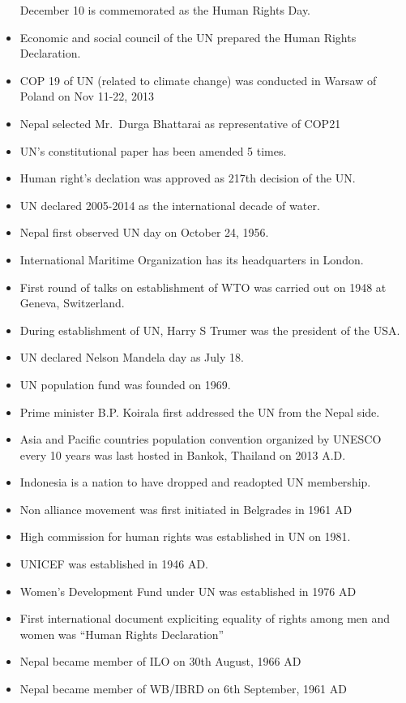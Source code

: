 \documentclass[
]{book}
\begin{document}
\begin{itemize}
  December 10 is commemorated as the Human Rights Day.
\item
  Economic and social council of the UN prepared the Human Rights Declaration.
\item
  COP 19 of UN (related to climate change) was conducted in Warsaw of Poland on Nov 11-22, 2013
\item
  Nepal selected Mr.~Durga Bhattarai as representative of COP21
\item
  UN's constitutional paper has been amended 5 times.
\item
  Human right's declation was approved as 217th decision of the UN.
\item
  UN declared 2005-2014 as the international decade of water.
\item
  Nepal first observed UN day on October 24, 1956.
\item
  International Maritime Organization has its headquarters in London.
\item
  First round of talks on establishment of WTO was carried out on 1948 at Geneva, Switzerland.
\item
  During establishment of UN, Harry S Trumer was the president of the USA.
\item
  UN declared Nelson Mandela day as July 18.
\item
  UN population fund was founded on 1969.
\item
  Prime minister B.P. Koirala first addressed the UN from the Nepal side.
\item
  Asia and Pacific countries population convention organized by UNESCO every 10 years was last hosted in Bankok, Thailand on 2013 A.D.
\item
  Indonesia is a nation to have dropped and readopted UN membership.
\item
  Non alliance movement was first initiated in Belgrades in 1961 AD
\item
  High commission for human rights was established in UN on 1981.
\item
  UNICEF was established in 1946 AD.
\item
  Women's Development Fund under UN was established in 1976 AD
\item
  First international document expliciting equality of rights among men and women was ``Human Rights Declaration''
\item
  Nepal became member of ILO on 30th August, 1966 AD
\item
  Nepal became member of WB/IBRD on 6th September, 1961 AD

\end{itemize}
\end{document}
